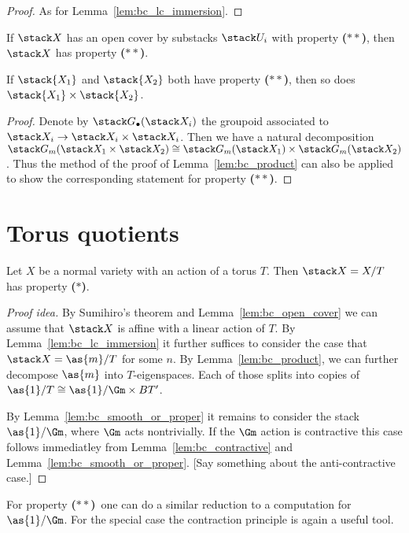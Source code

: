 \documentclass{ck-article}
\newcommand\bc{\textbf{($\mathbf{*}$)}}
\newcommand\hbc{\textbf{($\mathbf{**}$)}}
\begin{document}
\begin{proof}
    As for Lemma~\ref{lem:bc_lc_immersion}.
\end{proof}

\begin{Lem}\label{lem:hbc_open_cover}
    If $\stack X$ has an open cover by substacks $\stack U_i$ with property \hbc, then $\stack X$ has property \hbc.
\end{Lem}

\begin{Lem}\label{lem:hbc_product}
    If $\stack{X_1}$ and $\stack{X_2}$ both have property \hbc, then so does $\stack{X_1} \times \stack{X_2}$.
\end{Lem}

\begin{proof}
    Denote by $\stack G_\bullet(\stack X_i)$ the groupoid associated to $\stack X_i \to \stack X_i \times \stack X_i$.
    Then we have a natural decomposition $\stack G_m(\stack X_1 \times \stack X_2) \cong \stack G_m(\stack X_1) \times \stack G_m(\stack X_2)$.
    Thus the method of the proof of Lemma~\ref{lem:bc_product} can also be applied to show the corresponding statement for property \hbc.
\end{proof}

\section{Torus quotients}

\begin{Thm}
    Let $X$ be a normal variety with an action of a torus $T$.
    Then $\stack X = X/T$ has property \bc.
\end{Thm}

\begin{proof}[Proof idea]
    By Sumihiro's theorem \cite{Sumihiro:1974:EquivariantCompletions} and Lemma~\ref{lem:bc_open_cover} we can assume that $\stack X$ is affine with a linear action of $T$.
    By Lemma~\ref{lem:bc_lc_immersion} it further suffices to consider the case that $\stack X = \as{m}/T$ for some $n$.
    By Lemma~\ref{lem:bc_product}, we can further decompose $\as{m}$ into $T$-eigenspaces.
    Each of those splits into copies of $\as{1}/T \cong \as{1}/\Gm \times BT'$.
    
    By Lemma~\ref{lem:bc_smooth_or_proper} it remains to consider the stack $\as{1}/\Gm$, where $\Gm$ acts nontrivially.
    If the $\Gm$ action is contractive this case follows immediatley from Lemma~\ref{lem:bc_contractive} and Lemma~\ref{lem:bc_smooth_or_proper}.
    [Say something about the anti-contractive case.]
\end{proof}

For property \hbc\ one can do a similar reduction to a computation for $\as{1}/\Gm$.
For the special case the contraction principle is again a useful tool.

\printbibliography
\end{document}
